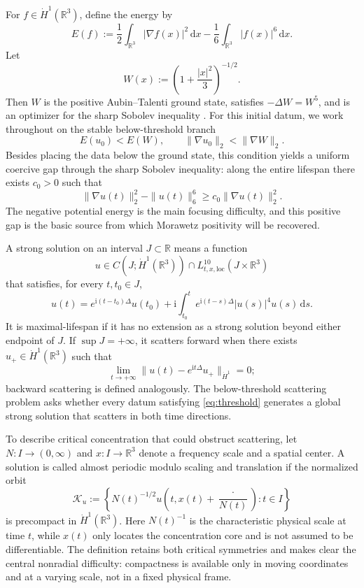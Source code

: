 \documentclass{interact}
\numberwithin{equation}{section}
\theoremstyle{plain}
\theoremstyle{definition}
\theoremstyle{remark}
\newcommand{\R}{\mathbb R}
\newcommand{\ii}{\mathrm i}
\newcommand{\dd}{\,\mathrm d}
\begin{document}
For $f\in\dot H^1(\R^3)$, define the energy by
\begin{equation}\label{eq:energy}
 E(f):=\frac12\int_{\R^3}|\nabla f(x)|^2\dd x
       -\frac16\int_{\R^3}|f(x)|^6\dd x.
\end{equation}
Let
\[
 W(x):=\left(1+\frac{|x|^2}{3}\right)^{-1/2}.
\]
Then $W$ is the positive Aubin--Talenti ground state, satisfies $-\Delta W=W^5$, and is an optimizer for the sharp Sobolev inequality \cite{Aubin1976,Talenti1976,Lieb1983}. For this initial datum, we work throughout on the stable below-threshold branch
\begin{equation}\label{eq:threshold}
 E(u_0)<E(W),
 \qquad
 \|\nabla u_0\|_2<\|\nabla W\|_2.
\end{equation}
Besides placing the data below the ground state, this condition yields a uniform coercive gap through the sharp Sobolev inequality: along the entire lifespan there exists $c_0>0$ such that
\[
 \|\nabla u(t)\|_2^2-\|u(t)\|_6^6
 \ge c_0\|\nabla u(t)\|_2^2.
\]
The negative potential energy is the main focusing difficulty, and this positive gap is the basic source from which Morawetz positivity will be recovered.

A strong solution on an interval $J\subset\R$ means a function
\[
 u\in C(J;\dot H^1(\R^3))\cap L^{10}_{t,x,\mathrm{loc}}(J\times\R^3)
\]
that satisfies, for every $t,t_0\in J$,
\[
 u(t)=e^{\ii(t-t_0)\Delta}u(t_0)
 +\ii\int_{t_0}^t e^{\ii(t-s)\Delta}|u(s)|^4u(s)\dd s.
\]
It is maximal-lifespan if it has no extension as a strong solution beyond either endpoint of $J$. If $\sup J=+\infty$, it scatters forward when there exists $u_+\in\dot H^1(\R^3)$ such that
\[
 \lim_{t\to+\infty}\|u(t)-e^{\ii t\Delta}u_+\|_{\dot H^1}=0;
\]
backward scattering is defined analogously. The below-threshold scattering problem asks whether every datum satisfying \eqref{eq:threshold} generates a global strong solution that scatters in both time directions.

To describe critical concentration that could obstruct scattering, let $N:I\to(0,\infty)$ and $x:I\to\R^3$ denote a frequency scale and a spatial center. A solution is called almost periodic modulo scaling and translation if the normalized orbit
\[
 \mathcal K_u
 :=\left\{
 N(t)^{-1/2}u\!\left(t,x(t)+\frac{\cdot}{N(t)}\right):t\in I
 \right\}
\]
is precompact in $\dot H^1(\R^3)$. Here $N(t)^{-1}$ is the characteristic physical scale at time $t$, while $x(t)$ only locates the concentration core and is not assumed to be differentiable. The definition retains both critical symmetries and makes clear the central nonradial difficulty: compactness is available only in moving coordinates and at a varying scale, not in a fixed physical frame.
\end{document}
